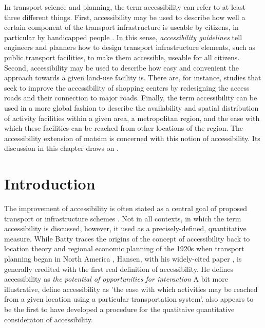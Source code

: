 In transport science and planning, the term accessibility can refer to at least three different things. 
First, accessibility may be used to describe how well a certain component of the transport infrastructure 
is useable by citizens, in particular by handicapped people \citep{Faura2012AccessibilityEvaluationTrafficSimulation}. 
In this sense, \textit{accessibility guidelines} tell engineers and planners how to design transport 
infrastructure elements, such as public transport facilities, to make them accessible, \ie useable 
for all citizens. Second, accessibility may be used to describe how easy and convenient the approach 
towards a given land-use facility is. There are, for instance, studies \citep{Fujiyama2004AccessibleDesignPTFacilities} 
that seek to improve the accessibility of shopping centers by redesigning the access roads and their 
connection to major roads. Finally, the term accessibility can be used in a more global fashion to 
describe the availability and spatial distribution of activity facilities within a given area, \eg a 
metropolitan region, and the ease with which these facilities can be reached from other locations of 
the region. The accessibility extension of \gls{matsim} is concerned with this notion of accessibility. 
Its discussion in this chapter draws on \citet{NicolaiNagel2012HiResAccessibilityMethodInBook}.


\section{Introduction}
The improvement of accessibility is often stated as a central goal of proposed transport or infrastructure 
schemes \citep{GeursEtAl2012AccessibilityTransportIntroduction}. Not in all contexts, in which the term 
accessibility is discussed, however, it used as a precisely-defined, quantitative measure. While Batty 
\citep{Batty2009} traces the origins of the concept of accessibility back to location theory and regional 
economic planning of the 1920s when transport planning began in North America \citep{GeursEtAl2012AccessibilityTransportIntroduction}, 
Hansen, with his widely-cited paper \citep{Hansen1959}, is generally credited with the first real 
definition of accessibility. He defines accessibility as \textit{the potential of opportunities for interaction} 
A bit more illustrative, \citet{MorrisEtAl1978AccessibilityIndicators} define accessibility as 'the ease with which activities may be reached from a given location using a particular transportation system'.
\citet{Hansen1959} also appears to be the first to have developed a procedure for the quatitaive quantitative 
consideraton of accessibility.

